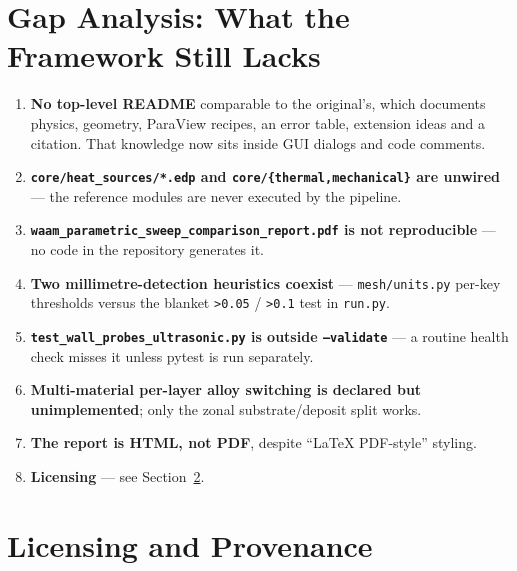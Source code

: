\documentclass[10pt,a4paper]{article}
\newcommand{\code}[1]{\texttt{#1}}
\newcommand{\file}[1]{\texttt{\small #1}}
\begin{document}
\section{Gap Analysis: What the Framework Still Lacks}

\begin{enumerate}[leftmargin=1.8em,itemsep=0.3em]
    \item \textbf{No top-level README} comparable to the original's, which
    documents physics, geometry, ParaView recipes, an error table, extension
    ideas and a citation. That knowledge now sits inside GUI dialogs and code
    comments.
    \item \textbf{\code{core/heat\_sources/*.edp} and
    \code{core/\{thermal,mechanical\}} are unwired} --- the reference modules
    are never executed by the pipeline.
    \item \textbf{\code{waam\_parametric\_sweep\_comparison\_report.pdf} is not
    reproducible} --- no code in the repository generates it.
    \item \textbf{Two millimetre-detection heuristics coexist} ---
    \file{mesh/units.py} per-key thresholds versus the blanket
    \code{>0.05} / \code{>0.1} test in \file{run.py}.
    \item \textbf{\code{test\_wall\_probes\_ultrasonic.py} is outside
    \code{--validate}} --- a routine health check misses it unless pytest is
    run separately.
    \item \textbf{Multi-material per-layer alloy switching is declared but
    unimplemented}; only the zonal substrate/deposit split works.
    \item \textbf{The report is HTML, not PDF}, despite ``LaTeX PDF-style''
    styling.
    \item \textbf{Licensing} --- see Section~\ref{sec:license}.
\end{enumerate}

\section{Licensing and Provenance}
\label{sec:license}
\end{document}
